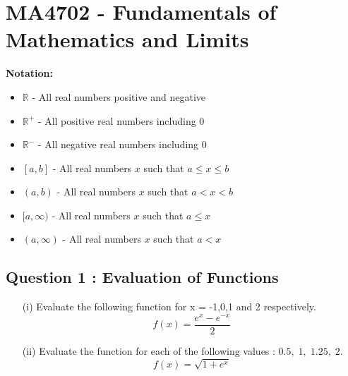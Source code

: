 \documentclass[]{article}
\begin{document}
\section*{MA4702 - Fundamentals of Mathematics and Limits}

\noindent \textbf{Notation:}
\begin{framed}
	\begin{multicols}{2}
		\begin{itemize}
			\item $\mathbb{R}$ - All real numbers positive and negative
			\item $\mathbb{R}^+$ - All positive real numbers including $0$
			\item $\mathbb{R}^-$ - All negative real numbers including $0$
			\item $[a,b]$ - All real numbers $x$ such that $a \le x \le b$
			\item $(a,b)$ - All real numbers $x$ such that $a < x < b$
			\item $[a,\infty)$ - All real numbers $x$ such that $a \le x$
			\item $(a,\infty)$ - All real numbers $x$ such that $a < x$
		\end{itemize} 
	\end{multicols}
\end{framed}


\subsection*{Question 1 : Evaluation of Functions}
	
	\begin{itemize}
		\item[(i)] Evaluate the following function for x = -1,0,1 and 2 respectively.
		{
			\Large
			\[ f(x) = \frac{e^x - {e^{-x}}}{2} \]
		}
		\item[(ii)] Evaluate the function for each of the following values : $0.5,\;1,\;1.25,\;2$.
		{
			\Large
			\[f(x) =  \sqrt{1+e^{x}}  \]
		}
	\end{itemize}
\end{document}
